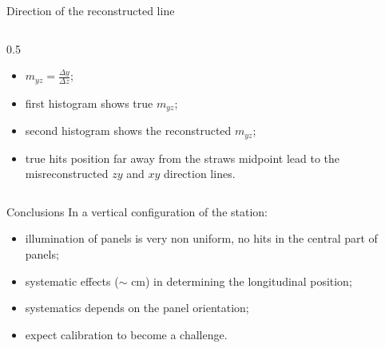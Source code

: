 \documentclass{beamer}[10pt]
\begin{document}
\begin{frame}{Direction of the reconstructed line}
\begin{columns}
\begin{column}{0.5\framewidth}
  \begin{itemize}
      
    \item $m_{yz}=\frac{\Delta y}{\Delta z}$;
    \vspace{2mm}
    \item first histogram shows true $m_{yz}$;
    \vspace{2mm}
    \item second histogram shows the reconstructed $m_{yz}$;
    \vspace{2mm}
    \item true hits position far away from the straws midpoint lead to the misreconstructed $zy$ and $xy$ direction lines.
  \end{itemize}
\end{column}
\end{columns}
\end{frame}


\begin{frame}{Conclusions}
  In a vertical configuration of the station:
  \vspace{6mm}
  \begin{itemize}
    \item illumination of panels is very non uniform, no hits in the central part of panels;
    \vspace{4mm}
    \item systematic effects ($\sim$ cm) in determining the longitudinal
    position;
    \vspace{4mm}
    \item systematics depends on the panel orientation;
    \vspace{4mm}
    \item expect calibration to become a challenge.
  \end{itemize}
\end{frame}
\end{document}
